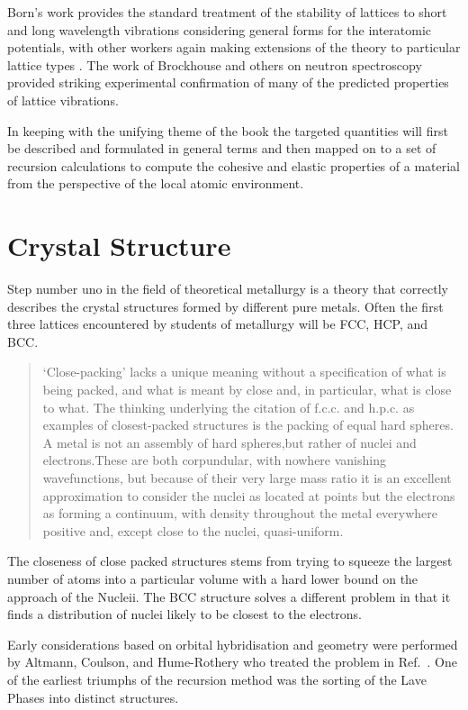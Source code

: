 Born's work provides the standard treatment of 
the stability of lattices to short and long wavelength
vibrations considering general forms for the interatomic potentials\cite{born40,born42},
with other workers again making extensions of the theory to particular
lattice types \cite{power41, nabarro52}. The work of Brockhouse and
others on neutron spectroscopy provided striking experimental confirmation
of many of the predicted properties of lattice vibrations.

In keeping with the unifying theme of the book the targeted quantities
will first be described and formulated in general terms and then mapped
on to a set of recursion calculations to compute the cohesive and elastic
properties of a material from the perspective of the local atomic environment.

\section{Crystal Structure}
Step number uno in the field of theoretical metallurgy is a theory that correctly
describes the crystal structures formed by different pure metals. 
Often the first three lattices encountered by students of metallurgy 
will be FCC, HCP, and BCC.

\begin{quote}
‘Close-packing’ lacks a unique meaning without a specification of 
what is being packed, and what is meant by close and, in particular, 
what is close to what. The thinking underlying the citation of f.c.c. 
and h.p.c. as examples of closest-packed structures is the packing of 
equal hard spheres. A metal is not an assembly of hard spheres,but rather of 
nuclei and electrons.These are both corpundular, with nowhere vanishing 
wavefunctions, but because of their very large mass ratio it is an excellent 
approximation to consider the nuclei as located at points
but the electrons as forming a continuum, with density throughout the metal 
everywhere positive and, except close to the nuclei, quasi-uniform.
\end{quote}

The closeness of close packed structures stems from trying to squeeze
the largest number of atoms into a particular volume
with a hard lower bound on the approach of the Nucleii.
The BCC structure solves a different problem in that it finds a
distribution of nuclei likely to be closest to the electrons.

Early considerations based on orbital hybridisation and geometry
were performed by Altmann, Coulson, and Hume-Rothery who treated 
the problem in Ref.~\cite{altmann57}. One of the earliest triumphs 
of the recursion method was the sorting of the Lave 
Phases \cite{haydocklaves75,johannes76} into distinct structures. 

